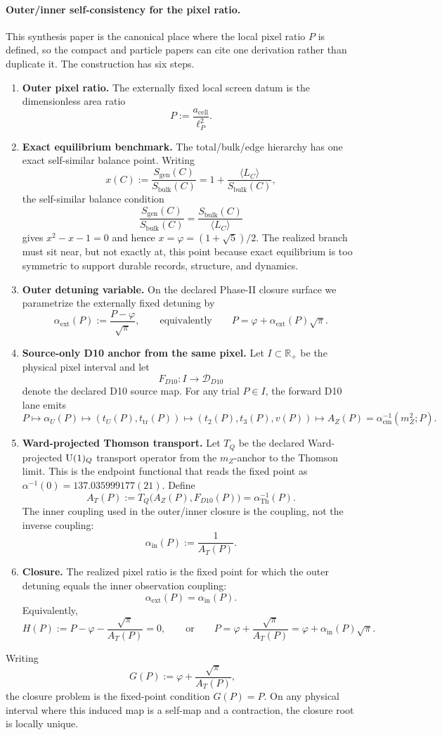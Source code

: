 \paragraph{Outer/inner self-consistency for the pixel ratio.}\label{sec:p-closure}
This synthesis paper is the canonical place where the local pixel ratio \(P\) is defined, so the
compact and particle papers can cite one derivation rather than duplicate it. The construction has
six steps.
\begin{enumerate}[leftmargin=2em]
\item \textbf{Outer pixel ratio.} The externally fixed local screen datum is the dimensionless area
ratio
\[
P:=\frac{a_{\mathrm{cell}}}{\ell_P^2}.
\]
\item \textbf{Exact equilibrium benchmark.} The total/bulk/edge hierarchy has one exact
self-similar balance point. Writing
\[
x(C):=\frac{S_{\mathrm{gen}}(C)}{S_{\mathrm{bulk}}(C)}
=
1+\frac{\langle L_C\rangle}{S_{\mathrm{bulk}}(C)},
\]
the self-similar balance condition
\[
\frac{S_{\mathrm{gen}}(C)}{S_{\mathrm{bulk}}(C)}
=
\frac{S_{\mathrm{bulk}}(C)}{\langle L_C\rangle}
\]
gives \(x^2-x-1=0\) and hence \(x=\varphi=(1+\sqrt5)/2\). The realized branch must sit near, but
not exactly at, this point because exact equilibrium is too symmetric to support durable records,
structure, and dynamics.
\item \textbf{Outer detuning variable.} On the declared Phase-II closure surface we parametrize
the externally fixed detuning by
\[
\alpha_{\mathrm{ext}}(P):=\frac{P-\varphi}{\sqrt{\pi}},
\qquad\text{equivalently}\qquad
P=\varphi+\alpha_{\mathrm{ext}}(P)\sqrt{\pi}.
\]
\item \textbf{Source-only D10 anchor from the same pixel.} Let \(I\subset\mathbb R_+\) be the
physical pixel interval and let
\[
F_{D10}:I\longrightarrow\mathcal D_{D10}
\]
denote the declared D10 source map. For any trial \(P\in I\), the forward D10 lane emits
\[
P\longmapsto \alpha_U(P)\longmapsto (t_U(P),t_{\mathrm{tr}}(P))
\longmapsto (t_2(P),t_3(P),v(P))
\longmapsto A_Z(P)=\alpha_{\mathrm{em}}^{-1}(m_Z^2;P).
\]
\item \textbf{Ward-projected Thomson transport.} Let \(T_Q\) be the declared Ward-projected
\(\mathrm{U}(1)_Q\) transport operator from the \(m_Z\)-anchor to the Thomson limit. This is the endpoint
functional that reads the fixed point as \(\alpha^{-1}(0)=137.035999177(21)\). Define
\[
A_T(P):=
T_Q\bigl(A_Z(P),F_{D10}(P)\bigr)
=
\alpha_{\mathrm{Th}}^{-1}(P).
\]
The inner coupling used in the outer/inner closure is the coupling, not the inverse coupling:
\[
\alpha_{\mathrm{in}}(P):=\frac{1}{A_T(P)}.
\]
\item \textbf{Closure.} The realized pixel ratio is the fixed point for which the outer detuning
equals the inner observation coupling:
\[
\alpha_{\mathrm{ext}}(P)=\alpha_{\mathrm{in}}(P).
\]
Equivalently,
\[
H(P):=P-\varphi-\frac{\sqrt{\pi}}{A_T(P)}=0,
\qquad\text{or}\qquad
P=\varphi+\frac{\sqrt{\pi}}{A_T(P)}=\varphi+\alpha_{\mathrm{in}}(P)\sqrt{\pi}.
\]
\end{enumerate}
Writing
\[
G(P):=\varphi+\frac{\sqrt{\pi}}{A_T(P)},
\]
the closure problem is the fixed-point condition \(G(P)=P\).
On any physical interval where this induced map is a self-map and a contraction, the closure root
is locally unique.

